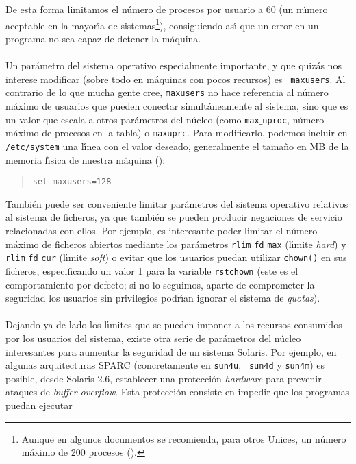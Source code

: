 \rm
De esta forma limitamos el n\'umero de procesos por usuario a 60 (un n\'umero
aceptable en la mayor\'{\i}a de sistemas\footnote{Aunque en algunos documentos
se recomienda, para otros Unices, un n\'umero m\'aximo de 200 procesos 
(\cite{kn:ciu99}).}), consiguiendo as\'{\i} que un error
en un programa no sea capaz de detener la m\'aquina.\\ 
\\Un par\'ametro del sistema operativo especialmente importante, y que quiz\'as
nos interese modificar (sobre todo en m\'aquinas con pocos recursos) es {\tt 
maxusers}. Al contrario de lo que mucha gente cree, {\tt maxusers} no hace 
referencia al n\'umero m\'aximo de usuarios que pueden conectar 
simult\'aneamente al sistema, sino que es un valor que escala a otros 
par\'ametros del 
n\'ucleo (como {\tt max$\_$nproc}, n\'umero m\'aximo de procesos en la tabla) o 
{\tt maxuprc}. Para modificarlo, podemos incluir en {\tt /etc/system} una 
l\'{\i}nea con el valor deseado, generalmente el tama\~no en MB de la memoria
f\'{\i}sica de nuestra m\'aquina (\cite{kn:dik99}):
\tt
\begin{quote}
\begin{verbatim}
set maxusers=128
\end{verbatim}
\end{quote}
\rm
Tambi\'en puede ser conveniente limitar par\'ametros del sistema operativo 
relativos al sistema de ficheros, ya que tambi\'en se pueden producir 
negaciones de servicio relacionadas con ellos. Por ejemplo, es interesante
poder limitar el n\'umero m\'aximo de ficheros abiertos mediante los 
par\'ametros {\tt rlim$\_$fd$\_$max} (l\'{\i}mite {\it hard}) y {\tt 
rlim$\_$fd$\_$cur} (l\'{\i}mite {\it soft}) o evitar que los usuarios puedan
utilizar {\tt chown()} en sus ficheros, especificando un valor 1 para la 
variable {\tt rstchown} (este es el comportamiento por defecto; si no lo 
seguimos, aparte de comprometer la seguridad los usuarios sin privilegios 
podr\'{\i}an ignorar el sistema de {\it quotas}).\\
\\Dejando ya de lado los l\'{\i}mites que se pueden imponer a los recursos
consumidos por los usuarios del sistema, existe otra serie de par\'ametros del
n\'ucleo interesantes para aumentar la seguridad de un sistema Solaris. Por 
ejemplo, en algunas arquitecturas SPARC (concretamente en {\tt sun4u}, {\tt 
sun4d} y {\tt sun4m}) es posible, desde Solaris 2.6, establecer una 
protecci\'on {\it hardware} para prevenir ataques de {\it buffer overflow}.
Esta protecci\'on consiste en impedir que los programas puedan ejecutar 
